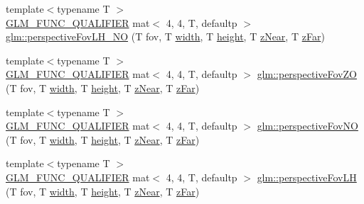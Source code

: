 \begin{DoxyCompactItemize}
\item 
{\footnotesize template$<$typename T $>$ }\\\hyperlink{setup_8hpp_a33fdea6f91c5f834105f7415e2a64407}{G\+L\+M\+\_\+\+F\+U\+N\+C\+\_\+\+Q\+U\+A\+L\+I\+F\+I\+ER} mat$<$ 4, 4, T, defaultp $>$ \hyperlink{group__gtc__matrix__transform_gad18a4495b77530317327e8d466488c1a}{glm\+::perspective\+Fov\+L\+H\+\_\+\+NO} (T fov, T \hyperlink{_s_d_l__opengl_8h_a9a82cf3caff84cabc4598e2619faac17}{width}, T \hyperlink{_s_d_l__opengl_8h_aa352f2804b9902ac30769c00dde75d5f}{height}, T \hyperlink{_s_d_l__opengl__glext_8h_a12d99226e590bbaaf0be69169eeb4834}{z\+Near}, T \hyperlink{_s_d_l__opengl__glext_8h_a1052a8235df129542aea6da80fbec6a1}{z\+Far})
\item 
{\footnotesize template$<$typename T $>$ }\\\hyperlink{setup_8hpp_a33fdea6f91c5f834105f7415e2a64407}{G\+L\+M\+\_\+\+F\+U\+N\+C\+\_\+\+Q\+U\+A\+L\+I\+F\+I\+ER} mat$<$ 4, 4, T, defaultp $>$ \hyperlink{group__gtc__matrix__transform_ga4bc69fa1d1f95128430aa3d2a712390b}{glm\+::perspective\+Fov\+ZO} (T fov, T \hyperlink{_s_d_l__opengl_8h_a9a82cf3caff84cabc4598e2619faac17}{width}, T \hyperlink{_s_d_l__opengl_8h_aa352f2804b9902ac30769c00dde75d5f}{height}, T \hyperlink{_s_d_l__opengl__glext_8h_a12d99226e590bbaaf0be69169eeb4834}{z\+Near}, T \hyperlink{_s_d_l__opengl__glext_8h_a1052a8235df129542aea6da80fbec6a1}{z\+Far})
\item 
{\footnotesize template$<$typename T $>$ }\\\hyperlink{setup_8hpp_a33fdea6f91c5f834105f7415e2a64407}{G\+L\+M\+\_\+\+F\+U\+N\+C\+\_\+\+Q\+U\+A\+L\+I\+F\+I\+ER} mat$<$ 4, 4, T, defaultp $>$ \hyperlink{group__gtc__matrix__transform_gaf30e7bd3b1387a6776433dd5383e6633}{glm\+::perspective\+Fov\+NO} (T fov, T \hyperlink{_s_d_l__opengl_8h_a9a82cf3caff84cabc4598e2619faac17}{width}, T \hyperlink{_s_d_l__opengl_8h_aa352f2804b9902ac30769c00dde75d5f}{height}, T \hyperlink{_s_d_l__opengl__glext_8h_a12d99226e590bbaaf0be69169eeb4834}{z\+Near}, T \hyperlink{_s_d_l__opengl__glext_8h_a1052a8235df129542aea6da80fbec6a1}{z\+Far})
\item 
{\footnotesize template$<$typename T $>$ }\\\hyperlink{setup_8hpp_a33fdea6f91c5f834105f7415e2a64407}{G\+L\+M\+\_\+\+F\+U\+N\+C\+\_\+\+Q\+U\+A\+L\+I\+F\+I\+ER} mat$<$ 4, 4, T, defaultp $>$ \hyperlink{group__gtc__matrix__transform_ga6aebe16c164bd8e52554cbe0304ef4aa}{glm\+::perspective\+Fov\+LH} (T fov, T \hyperlink{_s_d_l__opengl_8h_a9a82cf3caff84cabc4598e2619faac17}{width}, T \hyperlink{_s_d_l__opengl_8h_aa352f2804b9902ac30769c00dde75d5f}{height}, T \hyperlink{_s_d_l__opengl__glext_8h_a12d99226e590bbaaf0be69169eeb4834}{z\+Near}, T \hyperlink{_s_d_l__opengl__glext_8h_a1052a8235df129542aea6da80fbec6a1}{z\+Far})

\end{DoxyCompactItemize}
